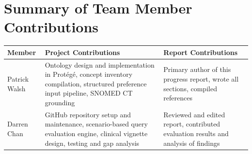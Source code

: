\documentclass[11pt]{article}
\begin{document}
\section{Summary of Team Member Contributions}

\begin{table}[ht]
\centering
\begin{tabularx}{\textwidth}{lXX}
\toprule
\textbf{Member} & \textbf{Project Contributions} & \textbf{Report Contributions} \\
\midrule
Patrick Walsh & Ontology design and implementation in Prot\'eg\'e, concept inventory compilation, structured preference input pipeline, SNOMED CT grounding & Primary author of this progress report, wrote all sections, compiled references \\[6pt]
Darren Chan & GitHub repository setup and maintenance, scenario-based query evaluation engine, clinical vignette design, testing and gap analysis & Reviewed and edited report, contributed evaluation results and analysis of findings \\
\bottomrule
\end{tabularx}
\end{table}
\end{document}
